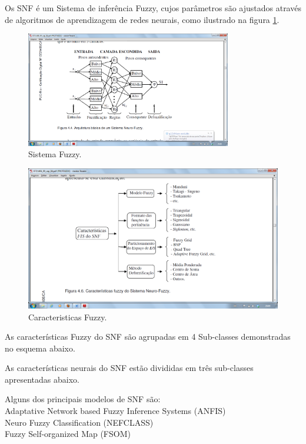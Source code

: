 \documentclass[a4paper,oneside,12pt]{article}
\begin{document}
Os SNF \'e um Sistema de infer\^encia Fuzzy, cujos par\^ametros  s\~ao ajustados atrav\'es de algoritmos de aprendizagem de redes neurais, como ilustrado na figura \ref{fig:f_1}.

\begin{figure}[h]
\centering
\includegraphics[trim=4cm 5cm 4cm 4cm, clip=true, width=0.8\textwidth]{f_1.png}
\caption{Sistema Fuzzy.}
\label{fig:f_1}
\end{figure}

\begin{figure}[h]
\centering
\includegraphics[trim=4cm 5cm 4cm 4cm, clip=true, width=1\textwidth]{f_2.png}
\caption{Caracteristicas Fuzzy.}
\label{fig:f_2}
\end{figure}

As caracter\'isticas Fuzzy do SNF s\~ao agrupadas em 4 Sub-classes demonstradas no esquema abaixo.

As caracter\'isticas neurais do SNF est\~ao divididas em tr\^es sub-classes apresentadas abaixo.

Alguns dos principais modelos de SNF s\~ao: \\
Adaptative Network based Fuzzy Inference Systems (ANFIS) \\
Neuro Fuzzy Classification (NEFCLASS) \\
Fuzzy Self-organized Map (FSOM) \\
\end{document}
